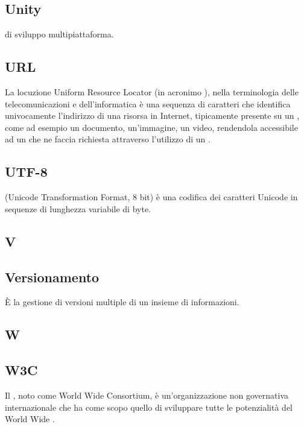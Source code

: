 \subsection{Unity}
 di sviluppo multipiattaforma.

\subsection{URL}
La locuzione Uniform Resource Locator (in acronimo ), nella terminologia delle telecomunicazioni e dell'informatica è una sequenza di caratteri che identifica univocamente l'indirizzo di una risorsa in Internet, tipicamente presente su un  , come ad esempio un documento, un'immagine, un video, rendendola accessibile ad un  che ne faccia richiesta attraverso l'utilizzo di un  .

\subsection{UTF-8}
 (Unicode Transformation Format, 8 bit) è una codifica dei caratteri Unicode in sequenze di lunghezza variabile di byte.

\newpage

\begin{center}
\Huge\section{\uppercase{V}}
\end{center}

\subsection{Versionamento}
È la gestione di versioni multiple di un insieme di informazioni.

\newpage

\begin{center}
\Huge\section{\uppercase{W}}
\end{center}

\subsection{W3C}
Il , noto come World Wide  Consortium, è un'organizzazione non governativa internazionale che ha come scopo quello di sviluppare tutte le potenzialità del World Wide .

